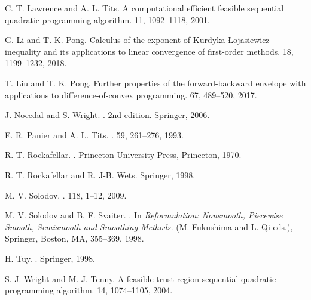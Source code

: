 \documentclass[10pt]{article}
\numberwithin{equation}{section}
\begin{document}
\begin{thebibliography}{99}
C. T. Lawrence and A. L. Tits.
\newblock A computational efficient feasible sequential quadratic programming algorithm.
 11, 1092--1118, 2001.

G. Li and T. K. Pong.
\newblock Calculus of the exponent of Kurdyka-{\L}ojasiewicz inequality and its applications to linear convergence of first-order methods.
 18, 1199--1232, 2018.

T. Liu and T. K. Pong.
\newblock Further properties of the forward-backward envelope with applications to difference-of-convex programming.
 67, 489--520, 2017.

J. Nocedal and S. Wright.
.
\newblock 2nd edition. Springer, 2006.


E. R. Panier and A. L. Tits.
.
 59, 261--276, 1993.

R. T. Rockafellar.
.
\newblock Princeton University Press, Princeton, 1970.

R. T. Rockafellar and R. J-B. Wets.
\newblock Springer, 1998.

M. V. Solodov.
.
 118, 1--12, 2009.

M. V. Solodov and B. F. Svaiter.
.
\newblock In {\em Reformulation: Nonsmooth, Piecewise Smooth, Semismooth and Smoothing Methods.} (M. Fukushima and L. Qi eds.), Springer, Boston, MA, 355--369, 1998.

H. Tuy.
.
\newblock Springer, 1998.


S. J. Wright and M. J. Tenny.
\newblock A feasible trust-region sequential quadratic programming algorithm.
 14, 1074--1105, 2004.


\end{thebibliography}
\end{document}
